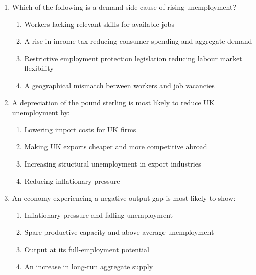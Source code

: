 \documentclass[12pt,a4paper]{article}
\begin{document}
\begin{enumerate}[leftmargin=*, label=\textbf{\arabic*.}]
    \vspace{0.4em}

    \item Which of the following is a demand-side cause of rising unemployment?
    \begin{enumerate}[label=(\Alph*), topsep=2pt]
        \item Workers lacking relevant skills for available jobs
        \item A rise in income tax reducing consumer spending and aggregate demand
        \item Restrictive employment protection legislation reducing labour market flexibility
        \item A geographical mismatch between workers and job vacancies
    \end{enumerate}

    \vspace{0.4em}

    \item A depreciation of the pound sterling is most likely to reduce UK unemployment by:
    \begin{enumerate}[label=(\Alph*), topsep=2pt]
        \item Lowering import costs for UK firms
        \item Making UK exports cheaper and more competitive abroad
        \item Increasing structural unemployment in export industries
        \item Reducing inflationary pressure
    \end{enumerate}

    \vspace{0.4em}

    \item An economy experiencing a negative output gap is most likely to show:
    \begin{enumerate}[label=(\Alph*), topsep=2pt]
        \item Inflationary pressure and falling unemployment
        \item Spare productive capacity and above-average unemployment
        \item Output at its full-employment potential
        \item An increase in long-run aggregate supply
    \end{enumerate}

    \vspace{0.4em}


\end{enumerate}
\end{document}
